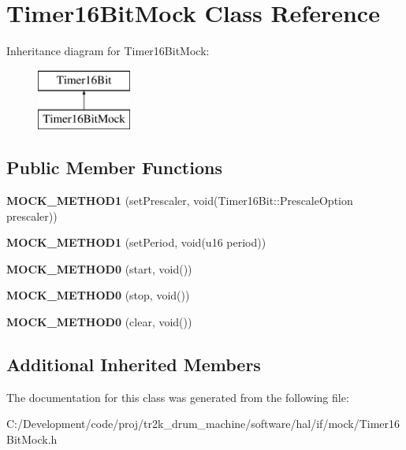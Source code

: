 \hypertarget{class_timer16_bit_mock}{}\section{Timer16\+Bit\+Mock Class Reference}
\label{class_timer16_bit_mock}
Inheritance diagram for Timer16\+Bit\+Mock\+:\begin{figure}[H]
\begin{center}
\leavevmode
\includegraphics[height=2.000000cm]{class_timer16_bit_mock}
\end{center}
\end{figure}
\subsection*{Public Member Functions}
\begin{DoxyCompactItemize}
\item 
\mbox{\label{class_timer16_bit_mock_a8272ab29daf94144c15f64c785e9026c}} 
{\bfseries M\+O\+C\+K\+\_\+\+M\+E\+T\+H\+O\+D1} (set\+Prescaler, void(Timer16\+Bit\+::\+Prescale\+Option prescaler))
\item 
\mbox{\label{class_timer16_bit_mock_a0a9dcbb8771b9f12575805ed70e8ae98}} 
{\bfseries M\+O\+C\+K\+\_\+\+M\+E\+T\+H\+O\+D1} (set\+Period, void(u16 period))
\item 
\mbox{\label{class_timer16_bit_mock_a574476d845314c4d19383c824a49b328}} 
{\bfseries M\+O\+C\+K\+\_\+\+M\+E\+T\+H\+O\+D0} (start, void())
\item 
\mbox{\label{class_timer16_bit_mock_a8a66e1fe5e8897588b5490c847251e95}} 
{\bfseries M\+O\+C\+K\+\_\+\+M\+E\+T\+H\+O\+D0} (stop, void())
\item 
\mbox{\label{class_timer16_bit_mock_aac6363ec6022b18cc5a612b56ef3573c}} 
{\bfseries M\+O\+C\+K\+\_\+\+M\+E\+T\+H\+O\+D0} (clear, void())
\end{DoxyCompactItemize}
\subsection*{Additional Inherited Members}


The documentation for this class was generated from the following file\+:\begin{DoxyCompactItemize}
\item 
C\+:/\+Development/code/proj/tr2k\+\_\+drum\+\_\+machine/software/hal/if/mock/Timer16\+Bit\+Mock.\+h\end{DoxyCompactItemize}
